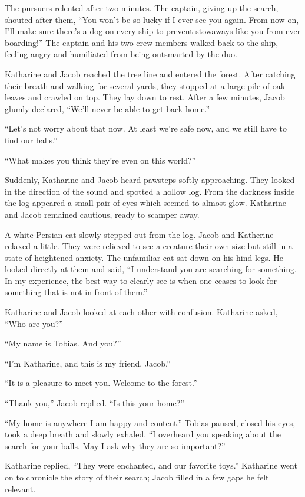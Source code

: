The pursuers relented after two minutes. The captain, giving up the search, shouted after them, “You won't be so lucky if I ever see you again. From now on, I'll make sure there's a dog on every ship to prevent stowaways like you from ever boarding!” The captain and his two crew members walked back to the ship, feeling angry and humiliated from being outsmarted by the duo.

\timesep

Katharine and Jacob reached the tree line and entered the forest. After catching their breath and walking for several yards, they stopped at a large pile of oak leaves and crawled on top. They lay down to rest. After a few minutes, Jacob glumly declared, “We'll never be able to get back home.”

“Let's not worry about that now. At least we're safe now, and we still have to find our balls.”

“What makes you think they're even on this world?”

Suddenly, Katharine and Jacob heard pawsteps softly approaching. They looked in the direction of the sound and spotted a hollow log. From the darkness inside the log appeared a small pair of eyes which seemed to almost glow. Katharine and Jacob remained cautious, ready to scamper away.

A white Persian cat slowly stepped out from the log. Jacob and Katherine relaxed a little. They were relieved to see a creature their own size but still in a state of heightened anxiety. The unfamiliar cat sat down on his hind legs. He looked directly at them and said, “I understand you are searching for something. In my experience, the best way to clearly see is when one ceases to look for something that is not in front of them.”

Katharine and Jacob looked at each other with confusion. Katharine asked, “Who are you?”

“My name is Tobias. And you?”

“I'm Katharine, and this is my friend, Jacob.”

“It is a pleasure to meet you. Welcome to the forest.”

“Thank you,” Jacob replied. “Is this your home?”

“My home is anywhere I am happy and content.” Tobias paused, closed his eyes, took a deep breath and slowly exhaled. “I overheard you speaking about the search for your balls. May I ask why they are so important?”

Katharine replied, “They were enchanted, and our favorite toys.” Katharine went on to chronicle the story of their search; Jacob filled in a few gaps he felt relevant.

